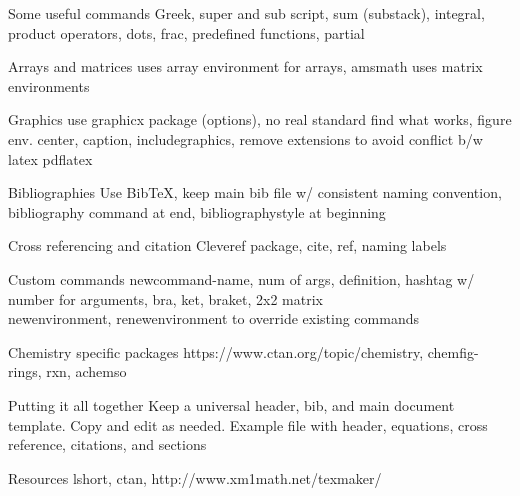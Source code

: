 \documentclass[11pt]{beamer}
\begin{document}
%
%
\begin{frame}{Some useful commands}
Greek, super and sub script, sum (substack), integral, product operators, dots, frac, predefined functions, partial
\end{frame}

%
%
\begin{frame}{Arrays and matrices}
uses array environment for arrays, amsmath uses matrix environments
\end{frame}

%
%
\begin{frame}{Graphics}
use graphicx package (options), no real standard find what works, figure env. center, caption, includegraphics, remove extensions to avoid conflict b/w latex pdflatex
\end{frame}

%
%
\begin{frame}{Bibliographies}
Use BibTeX, keep main bib file w/ consistent naming convention, bibliography command at end, bibliographystyle at beginning
\end{frame}

%
%
\begin{frame}{Cross referencing and citation}
Cleveref package, cite, ref, naming labels
\end{frame}

%
%
\begin{frame}{Custom commands}
newcommand-name, num of args, definition, hashtag w/ number for arguments, bra, ket, braket, 2x2 matrix \\
newenvironment, renewenvironment to override existing commands
\end{frame}

%
%
\begin{frame}{Chemistry specific packages}
https://www.ctan.org/topic/chemistry, chemfig-rings, rxn, achemso
\end{frame}

%
%
\begin{frame}{Putting it all together}
Keep a universal header, bib, and main document template. Copy and edit as needed. Example file with header, equations, cross reference, citations, and sections
\end{frame}

%
%
\begin{frame}{Resources}
lshort, ctan, http://www.xm1math.net/texmaker/
\end{frame}
\end{document}
